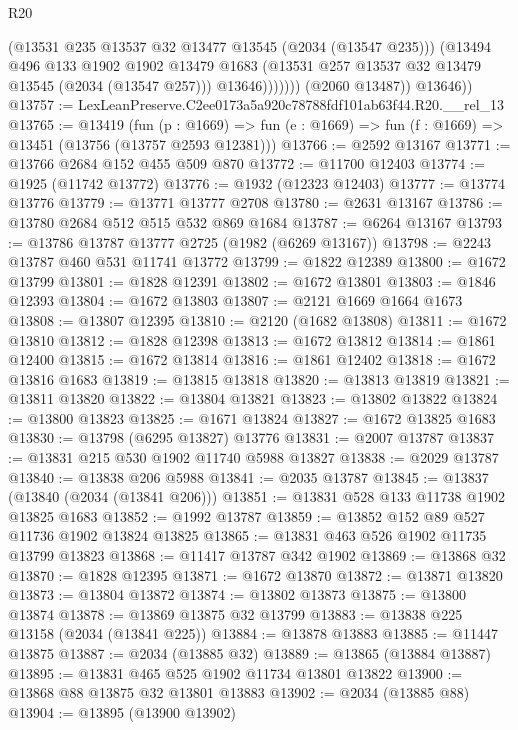 \begin{lexlean}{R20}
\begin{coremodule}
                      (@13531 @235 @13537 @32 @13477 @13545 (@2034 (@13547 @235)))
                      (@13494
                        @496
                        @133
                        @1902
                        @1902
                        @13479
                        @1683
                        (@13531 @257 @13537 @32 @13479 @13545 (@2034 (@13547 @257)))
                        @13646)))))))
          (@2060 @13487))
        @13646))
@13757 := LexLeanPreserve.C2ee0173a5a920c78788fdf101ab63f44.R20.__rel_13
@13765 := @13419
    (fun (p : @1669) => fun (e : @1669) => fun (f : @1669) => @13451 (@13756 (@13757 @2593 @12381)))
@13766 := @2592 @13167
@13771 := @13766 @2684 @152 @455 @509 @870
@13772 := @11700 @12403
@13774 := @1925 (@11742 @13772)
@13776 := @1932 (@12323 @12403)
@13777 := @13774 @13776
@13779 := @13771 @13777 @2708
@13780 := @2631 @13167
@13786 := @13780 @2684 @512 @515 @532 @869 @1684
@13787 := @6264 @13167
@13793 := @13786 @13787 @13777 @2725 (@1982 (@6269 @13167))
@13798 := @2243 @13787 @460 @531 @11741 @13772
@13799 := @1822 @12389
@13800 := @1672 @13799
@13801 := @1828 @12391
@13802 := @1672 @13801
@13803 := @1846 @12393
@13804 := @1672 @13803
@13807 := @2121 @1669 @1664 @1673
@13808 := @13807 @12395
@13810 := @2120 (@1682 @13808)
@13811 := @1672 @13810
@13812 := @1828 @12398
@13813 := @1672 @13812
@13814 := @1861 @12400
@13815 := @1672 @13814
@13816 := @1861 @12402
@13818 := @1672 @13816 @1683
@13819 := @13815 @13818
@13820 := @13813 @13819
@13821 := @13811 @13820
@13822 := @13804 @13821
@13823 := @13802 @13822
@13824 := @13800 @13823
@13825 := @1671 @13824
@13827 := @1672 @13825 @1683
@13830 := @13798 (@6295 @13827) @13776
@13831 := @2007 @13787
@13837 := @13831 @215 @530 @1902 @11740 @5988 @13827
@13838 := @2029 @13787
@13840 := @13838 @206 @5988
@13841 := @2035 @13787
@13845 := @13837 (@13840 (@2034 (@13841 @206)))
@13851 := @13831 @528 @133 @11738 @1902 @13825 @1683
@13852 := @1992 @13787
@13859 := @13852 @152 @89 @527 @11736 @1902 @13824 @13825
@13865 := @13831 @463 @526 @1902 @11735 @13799 @13823
@13868 := @11417 @13787 @342 @1902
@13869 := @13868 @32
@13870 := @1828 @12395
@13871 := @1672 @13870
@13872 := @13871 @13820
@13873 := @13804 @13872
@13874 := @13802 @13873
@13875 := @13800 @13874
@13878 := @13869 @13875 @32 @13799
@13883 := @13838 @225 @13158 (@2034 (@13841 @225))
@13884 := @13878 @13883
@13885 := @11447 @13875
@13887 := @2034 (@13885 @32)
@13889 := @13865 (@13884 @13887)
@13895 := @13831 @465 @525 @1902 @11734 @13801 @13822
@13900 := @13868 @88 @13875 @32 @13801 @13883
@13902 := @2034 (@13885 @88)
@13904 := @13895 (@13900 @13902)

\end{coremodule}
\end{lexlean}
